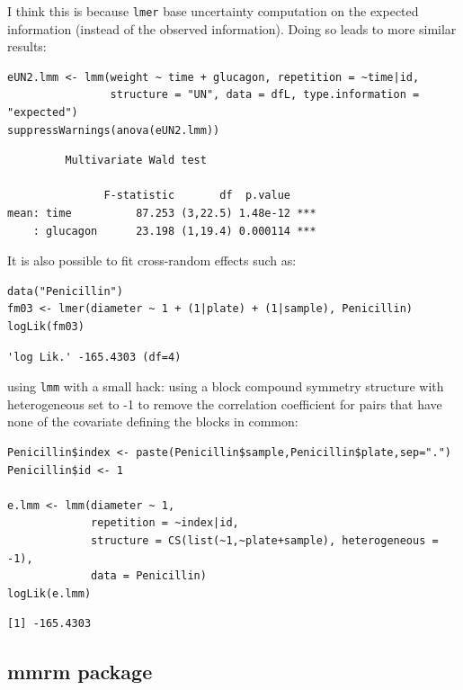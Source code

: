 \documentclass[12pt]{article}
\begin{document}
I think this is because \texttt{lmer} base uncertainty computation on the
expected information (instead of the observed information). Doing so
leads to more similar results:
\lstset{language=r,label= ,caption= ,captionpos=b,numbers=none}
\begin{lstlisting}
eUN2.lmm <- lmm(weight ~ time + glucagon, repetition = ~time|id,
                structure = "UN", data = dfL, type.information = "expected")
suppressWarnings(anova(eUN2.lmm))
\end{lstlisting}

\begin{verbatim}
	     Multivariate Wald test 

               F-statistic       df  p.value    
mean: time          87.253 (3,22.5) 1.48e-12 ***
    : glucagon      23.198 (1,19.4) 0.000114 ***
\end{verbatim}


It is also possible to fit cross-random effects such as:
\lstset{language=r,label= ,caption= ,captionpos=b,numbers=none}
\begin{lstlisting}
data("Penicillin")
fm03 <- lmer(diameter ~ 1 + (1|plate) + (1|sample), Penicillin)
logLik(fm03)
\end{lstlisting}

\begin{verbatim}
'log Lik.' -165.4303 (df=4)
\end{verbatim}


using \texttt{lmm} with a small hack: using a block compound symmetry
structure with heterogeneous set to -1 to remove the correlation
coefficient for pairs that have none of the covariate defining the
blocks in common:
\lstset{language=r,label= ,caption= ,captionpos=b,numbers=none}
\begin{lstlisting}
Penicillin$index <- paste(Penicillin$sample,Penicillin$plate,sep=".")
Penicillin$id <- 1

e.lmm <- lmm(diameter ~ 1,
             repetition = ~index|id,
             structure = CS(list(~1,~plate+sample), heterogeneous = -1),
             data = Penicillin)
logLik(e.lmm)
\end{lstlisting}

\begin{verbatim}
[1] -165.4303
\end{verbatim}

\subsection{mmrm package}
\label{sec:org87dcfb1}
\end{document}

